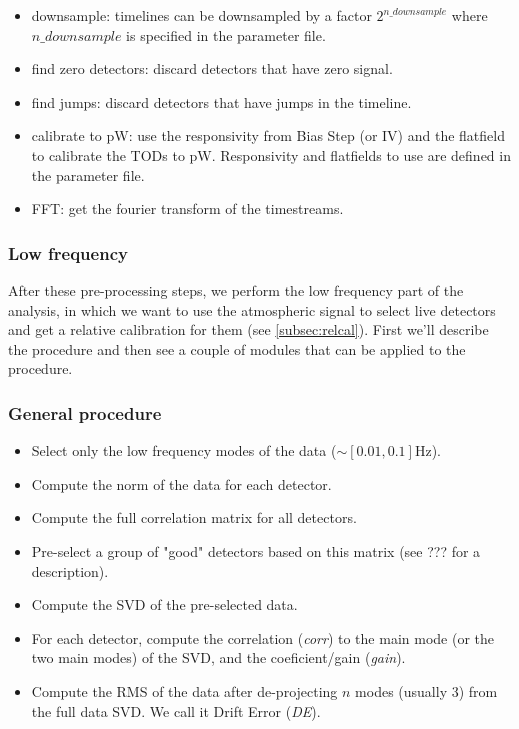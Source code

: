 \documentclass[a4paper, 11pt]{article}
\begin{document}
\begin{itemize}
	\item downsample: timelines can be downsampled by a {}factor $2^{n\_downsample}$ where $n\_downsample$ is specified in the parameter file.
	\item find zero detectors: discard detectors that have zero signal.
	\item find jumps: discard detectors that have jumps in the timeline.
	\item calibrate to pW: use the responsivity from Bias Step (or IV) and the flatfield to calibrate the TODs to pW. Responsivity and flatfields to use are defined in the parameter file.
	\item FFT: get the fourier transform of the timestreams.
\end{itemize}

\subsubsection{Low frequency}
After these pre-processing steps, we perform the low frequency part of the analysis, in which we want to use the atmospheric signal to select live detectors and get a relative calibration for them (see \ref{subsec:relcal}). First we'll describe the procedure and then see a couple of modules that can be applied to the procedure.

\subsubsection*{General procedure}
\begin{itemize}
	\item Select only the low frequency modes of the data ($\sim [0.01,0.1]$Hz).
	\item Compute the norm of the data for each detector.
	\item Compute the full correlation matrix for all detectors.
	\item Pre-select a group of "good" detectors based on this matrix (see ??? for a description).
	\item Compute the SVD of the pre-selected data.
	\item For each detector, compute the correlation (\emph{corr}) to the main mode (or the two main modes) of the SVD, and the coeficient/gain (\emph{gain}).
	\item Compute the RMS of the data after de-projecting $n$ modes (usually 3) from the full data SVD. We call it Drift Error (\emph{DE}).
\end{itemize}
\end{document}
